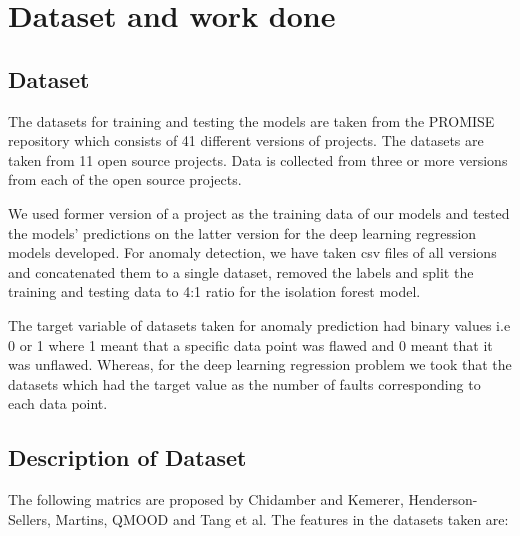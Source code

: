 \chapter{Dataset and work done}\label{final}
\section{Dataset}\label{sec2.1}
 The datasets for training and testing the models are taken from the PROMISE repository which consists of 41 different versions of projects. The datasets are taken from 11 open source projects. Data is collected from three or more versions from each of the open source projects.
 
 We used former version of a project as the training data of our models and tested the models' predictions on the latter version for the deep learning regression models developed.
 For anomaly detection, we have taken csv files of all versions and concatenated them to a single dataset, removed the labels and split the training and testing data to 4:1 ratio for the isolation forest model.
 
 The target variable of datasets taken for anomaly prediction had binary values i.e 0 or 1 where 1 meant that a specific data point was flawed and 0 meant that it was unflawed. Whereas, for the deep learning regression problem we took that the datasets which had the target value as the number of faults corresponding to each data point.

\section{Description of Dataset}\label{sec2.2}
The following matrics are proposed by Chidamber and Kemerer, Henderson-Sellers, Martins, QMOOD and Tang et al.
The features in the datasets taken are: 

